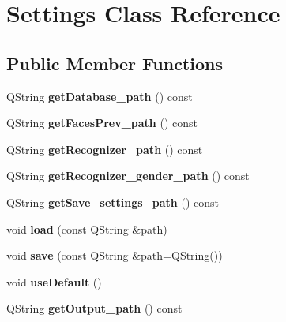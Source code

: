 \hypertarget{classSettings}{}\section{Settings Class Reference}
\label{classSettings}
\subsection*{Public Member Functions}
\begin{DoxyCompactItemize}
\item 
\mbox{\label{classSettings_a4f2325e77317ffbfb532cce932b7ffa9}} 
Q\+String {\bfseries get\+Database\+\_\+path} () const
\item 
\mbox{\label{classSettings_adcbf70b63bc3b1d0f86d5b97fb579ec8}} 
Q\+String {\bfseries get\+Faces\+Prev\+\_\+path} () const
\item 
\mbox{\label{classSettings_a66a13313a92a65f02ae991acfa73ff5a}} 
Q\+String {\bfseries get\+Recognizer\+\_\+path} () const
\item 
\mbox{\label{classSettings_a33a0681d2c594a22aa37becaa203d7dd}} 
Q\+String {\bfseries get\+Recognizer\+\_\+gender\+\_\+path} () const
\item 
\mbox{\label{classSettings_acc4435e11cd77355c867d58216432ffb}} 
Q\+String {\bfseries get\+Save\+\_\+settings\+\_\+path} () const
\item 
\mbox{\label{classSettings_a6f12c7cbcca9bed562450d393db4f697}} 
void {\bfseries load} (const Q\+String \&path)
\item 
\mbox{\label{classSettings_abd720f5e7a5eaea964578eab151da989}} 
void {\bfseries save} (const Q\+String \&path=Q\+String())
\item 
\mbox{\label{classSettings_ad9bd331d9b049bf8d37cd94815c9dbfd}} 
void {\bfseries use\+Default} ()
\item 
\mbox{\label{classSettings_abc0f51cf1d20d0023e940b343c8e68b0}} 
Q\+String {\bfseries get\+Output\+\_\+path} () const
\item 

\end{DoxyCompactItemize}
